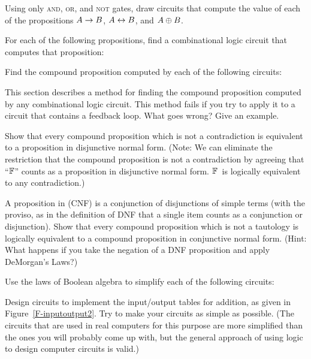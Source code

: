 \begin{exercises}

\problem Using only \textsc{and}, \textsc{or}, and \textsc{not} gates,
draw circuits that compute the value of each of the propositions
$A\rightarrow B$, $A\leftrightarrow B$, and $A\oplus B$.

\problem For each of the following propositions, find a combinational
logic circuit that computes that proposition:

\problem Find the compound proposition computed by each of the
following circuits:
\medskip

\centerline{\qquad{}}

\problem This section describes a method for finding the compound
proposition computed by any combinational logic circuit.  This method
fails if you try to apply it to a circuit that contains a feedback loop.
What goes wrong?  Give an example.

\problem Show that every compound proposition which is not a contradiction
is equivalent to a proposition in disjunctive normal form.  (Note: We can
eliminate the restriction that the compound proposition is not a
contradiction by agreeing that ``$\mathbb{F}$'' counts as a proposition in
disjunctive normal form.  $\mathbb{F}$~is logically equivalent to any contradiction.)

\problem A proposition in  (CNF) is
a conjunction of disjunctions of simple terms (with the proviso, as 
in the definition of DNF that a single item counts as a conjunction
or disjunction).  Show that every 
compound proposition which is not a tautology is logically equivalent
to a compound proposition in conjunctive normal form.  (Hint:
What happens if you take the negation of a DNF proposition and
apply DeMorgan's Laws?)

\problem Use the laws of Boolean algebra to simplify each of the
following circuits:
\medskip



\problem Design circuits to implement the input/output tables
for addition, as given in Figure~\ref{F-inputoutput2}.  Try to
make your circuits as simple as possible.  (The circuits that are
used in real computers for this purpose are more simplified than
the ones you will probably come up with, but the general approach
of using logic to design computer circuits is valid.)

\end{exercises}


